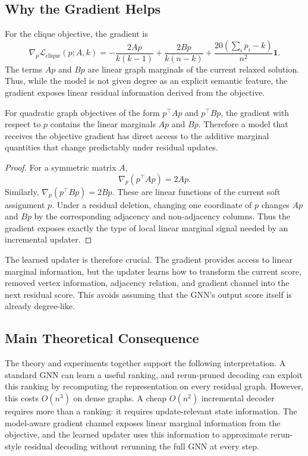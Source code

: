 \subsection{Why the Gradient Helps}

For the clique objective, the gradient is
\[
  \nabla_p \mathcal{L}_{\mathrm{clique}}(p;A,k)
  =
  -\frac{2Ap}{k(k-1)}
  +\frac{2Bp}{k(n-k)}
  +\frac{20(\sum_i p_i-k)}{n^2}\mathbf{1} .
\]
The terms $Ap$ and $Bp$ are linear graph marginals of the current relaxed solution. Thus, while the model is not given degree as an explicit semantic feature, the gradient exposes linear residual information derived from the objective.

\begin{proposition}
  For quadratic graph objectives of the form $p^\top A p$ and $p^\top Bp$, the gradient with respect to $p$ contains the linear marginals $Ap$ and $Bp$. Therefore a model that receives the objective gradient has direct access to the additive marginal quantities that change predictably under residual updates.
\end{proposition}

\begin{proof}
  For a symmetric matrix $A$,
  \[
    \nabla_p(p^\top A p) = 2Ap .
  \]
  Similarly, $\nabla_p(p^\top Bp)=2Bp$. These are linear functions of the current soft assignment $p$. Under a residual deletion, changing one coordinate of $p$ changes $Ap$ and $Bp$ by the corresponding adjacency and non-adjacency columns. Thus the gradient exposes exactly the type of local linear marginal signal needed by an incremental updater.
\end{proof}

The learned updater is therefore crucial. The gradient provides access to linear marginal information, but the updater learns how to transform the current score, removed vertex information, adjacency relation, and gradient channel into the next residual score. This avoids assuming that the GNN's output score itself is already degree-like.

\subsection{Main Theoretical Consequence}

The theory and experiments together support the following interpretation. A standard GNN can learn a useful ranking, and rerun-pruned decoding can exploit this ranking by recomputing the representation on every residual graph. However, this costs $O(n^3)$ on dense graphs. A cheap $O(n^2)$ incremental decoder requires more than a ranking: it requires update-relevant state information. The model-aware gradient channel exposes linear marginal information from the objective, and the learned updater uses this information to approximate rerun-style residual decoding without rerunning the full GNN at every step.
